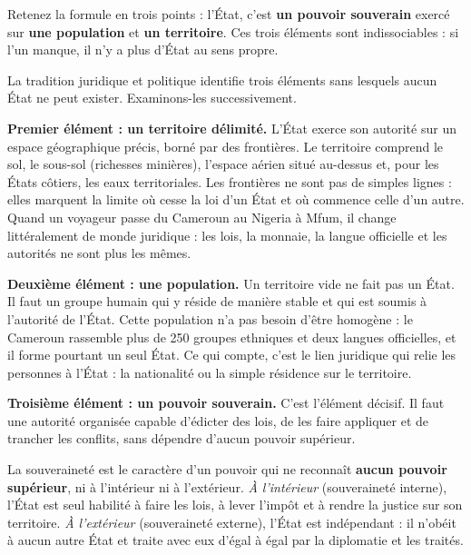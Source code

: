 \documentclass[11pt]{article}
\newcommand{\cle}[1]{{\popxbold\color{popdark}#1}}
\newcounter{popsec}
\newcounter{popsub}
\newcommand{\courssub}[1]{%
  \stepcounter{popsub}%
  \par\vspace{9pt}\noindent{\popxbold\fontsize{11.5}{13}\selectfont\color{popink}{\color{poporange}\thepopsec.\thepopsub}\hspace{6pt}#1}\par\nopagebreak\vspace{4pt}
}
\begin{document}
\begin{aretenir}
Retenez la formule en trois points : l'État, c'est \textbf{un pouvoir souverain} exercé sur \textbf{une population} et \textbf{un territoire}. Ces trois éléments sont indissociables : si l'un manque, il n'y a plus d'État au sens propre.
\end{aretenir}

\courssub{Les trois éléments constitutifs de l'État}

La tradition juridique et politique identifie trois éléments sans lesquels aucun État ne peut exister. Examinons-les successivement.

\textbf{Premier élément : un territoire délimité.} L'État exerce son autorité sur un espace géographique précis, borné par des \cle{frontières}. Le territoire comprend le sol, le sous-sol (richesses minières), l'espace aérien situé au-dessus et, pour les États côtiers, les eaux territoriales. Les frontières ne sont pas de simples lignes : elles marquent la limite où cesse la loi d'un État et où commence celle d'un autre. Quand un voyageur passe du Cameroun au Nigeria à Mfum, il change littéralement de monde juridique : les lois, la monnaie, la langue officielle et les autorités ne sont plus les mêmes.

\textbf{Deuxième élément : une population.} Un territoire vide ne fait pas un État. Il faut un groupe humain qui y réside de manière stable et qui est soumis à l'autorité de l'État. Cette population n'a pas besoin d'être homogène : le Cameroun rassemble plus de 250 groupes ethniques et deux langues officielles, et il forme pourtant un seul État. Ce qui compte, c'est le lien juridique qui relie les personnes à l'État : la \cle{nationalité} ou la simple résidence sur le territoire.

\textbf{Troisième élément : un pouvoir souverain.} C'est l'élément décisif. Il faut une autorité organisée capable d'édicter des lois, de les faire appliquer et de trancher les conflits, sans dépendre d'aucun pouvoir supérieur.

\begin{definition}[La souveraineté]
La \cle{souveraineté} est le caractère d'un pouvoir qui ne reconnaît \textbf{aucun pouvoir supérieur}, ni à l'intérieur ni à l'extérieur. \emph{À l'intérieur} (souveraineté interne), l'État est seul habilité à faire les lois, à lever l'impôt et à rendre la justice sur son territoire. \emph{À l'extérieur} (souveraineté externe), l'État est indépendant : il n'obéit à aucun autre État et traite avec eux d'égal à égal par la diplomatie et les traités.
\end{definition}
\end{document}
